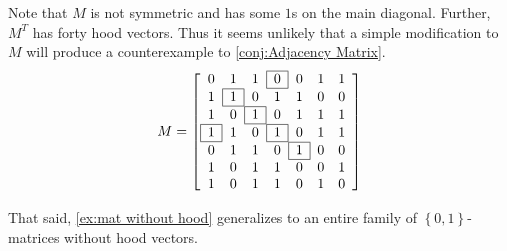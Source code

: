 Note that $M$ is not symmetric and has some $1$s on the main diagonal. Further, $M^T$ has forty hood vectors. Thus it seems unlikely that a simple modification to $M$ will produce a counterexample to \autoref{conj:Adjacency Matrix}.
\newcommand{\bxl}[1]{\hspace{-\arraycolsep}\begin{array}{|c|}\hline #1\\\hline\end{array}\hspace{-\arraycolsep}}
\[ \linespread{1}\selectfont M = \left[
	\begin{array}{ccccccc}
		0		&1		&1		&\bxl{0}	&0		&1		&1\\
		1		&\bxl{1}	&0		&1		&1		&0		&0\\
		1		&0		&\bxl{1}	&0		&1		&1		&1\\
		\bxl{1}	&1		&0		&\bxl{1}	&0		&1		&1\\
		0		&1		&1		&0		&\bxl{1}	&0		&0\\
		1		&0		&1		&1		&0		&0		&1\\
		1		&0		&1		&1		&0		&1		&0
	\end{array} \right]
\]

That said, \autoref{ex:mat without hood} generalizes to an entire family of $\left\{0,1\right\}$-matrices without hood vectors.

